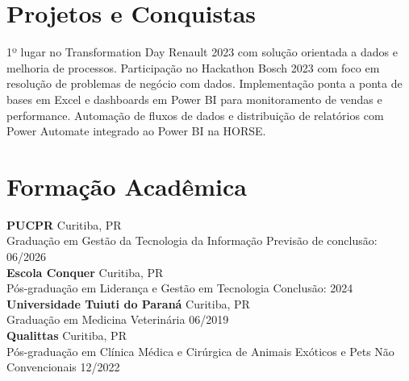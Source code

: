 \documentclass[11pt,a4paper]{article}
\begin{document}
\section{Projetos e Conquistas}

1º lugar no Transformation Day Renault 2023 com solução orientada a dados e melhoria de processos. Participação no Hackathon Bosch 2023 com foco em resolução de problemas de negócio com dados. Implementação ponta a ponta de bases em Excel e dashboards em Power BI para monitoramento de vendas e performance. Automação de fluxos de dados e distribuição de relatórios com Power Automate integrado ao Power BI na HORSE.

\section{Formação Acadêmica}

\textbf{PUCPR} \hfill Curitiba, PR\\
Graduação em Gestão da Tecnologia da Informação \hfill Previsão de conclusão: 06/2026\\[6pt]

\textbf{Escola Conquer} \hfill Curitiba, PR\\
Pós-graduação em Liderança e Gestão em Tecnologia \hfill Conclusão: 2024\\[6pt]

\textbf{Universidade Tuiuti do Paraná} \hfill Curitiba, PR\\
Graduação em Medicina Veterinária \hfill 06/2019\\[6pt]

\textbf{Qualittas} \hfill Curitiba, PR\\
Pós-graduação em Clínica Médica e Cirúrgica de Animais Exóticos e Pets Não Convencionais \hfill 12/2022
\end{document}
